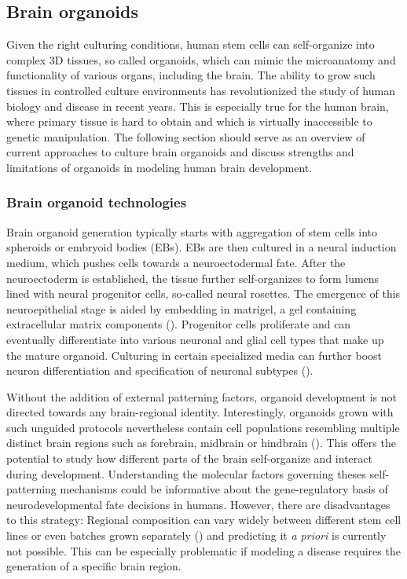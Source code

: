 \clearpage


\subsection{Brain organoids}

Given the right culturing conditions, human stem cells can self-organize into complex 3D tissues, so called organoids, which can mimic the microanatomy and functionality of various organs, including the brain. The ability to grow such tissues in controlled culture environments has revolutionized the study of human biology and disease in recent years. This is especially true for the human brain, where primary tissue is hard to obtain and which is virtually inaccessible to genetic manipulation. The following section should serve as an overview of current approaches to culture brain organoids and discuss strengths and limitations of organoids in modeling human brain development.


\subsubsection{Brain organoid technologies}
Brain organoid generation typically starts with aggregation of stem cells into spheroids or embryoid bodies (EBs). EBs are then cultured in a neural induction medium, which pushes cells towards a neuroectodermal fate. After the neuroectoderm is established, the tissue further self-organizes to form lumens lined with neural progenitor cells, so-called neural rosettes. The emergence of this neuroepithelial stage is aided by embedding in matrigel, a gel containing extracellular matrix components (\cite{lancaster_cerebral_2013,eiraku_self-organizing_2011}). Progenitor cells proliferate and can eventually differentiate into various neuronal and glial cell types that make up the mature organoid. Culturing in certain specialized media can further boost neuron differentiation and specification of neuronal subtypes (\cite{bardy_neuronal_2015}). 

Without the addition of external patterning factors, organoid development is not directed towards any brain-regional identity. Interestingly, organoids grown with such unguided protocols nevertheless contain cell populations resembling multiple distinct brain regions such as forebrain, midbrain or hindbrain (\cite{lancaster_cerebral_2013,kadoshima_self-organization_2013}). This offers the potential to study how different parts of the brain self-organize and interact during development. Understanding the molecular factors governing theses self-patterning mechanisms could be informative about the gene-regulatory basis of neurodevelopmental fate decisions in humans. However, there are disadvantages to this strategy: Regional composition can vary widely between different stem cell lines or even batches grown separately (\cite{kanton_organoid_2019}) and predicting it \textit{a priori} is currently not possible. This can be especially problematic if modeling a disease requires the generation of a specific brain region.

